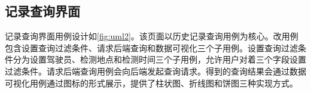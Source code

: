 



\subsection{记录查询界面}
记录查询界面用例设计如\ref{fig:uml2}。该页面以历史记录查询用例为核心。改用例包含设置查询过滤条件、请求后端查询和数据可视化三个子用例。设置查询过滤条件分为设置驾驶员、检测地点和检测时间三个子用例，允许用户对着三个字段设置过滤条件。请求后端查询用例会向后端发起查询请求。得到的查询结果会通过数据可视化用例通过图标的形式展示，提供了柱状图、折线图和饼图三种实现方式。

